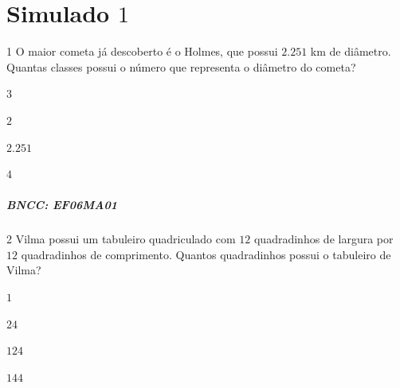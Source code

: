 {%

\chapter{Simulado $1$}

\num{1}  O maior cometa já descoberto é o Holmes, que possui $2.251$ km de
diâmetro. Quantas classes possui o número que representa o diâmetro do cometa?

\begin{escolha}
\item $3$
\item $2$
\item $2.251$
\item $4$
\end{escolha}

\paragraph{BNCC: EF06MA01 }


\num{2}  Vilma possui um tabuleiro quadriculado com $12$ quadradinhos de largura
por $12$ quadradinhos de comprimento. Quantos quadradinhos possui o
tabuleiro de Vilma?

\begin{escolha}
\item $1$
\item $24$
\item $124$
\item $144$
\end{escolha}

}
